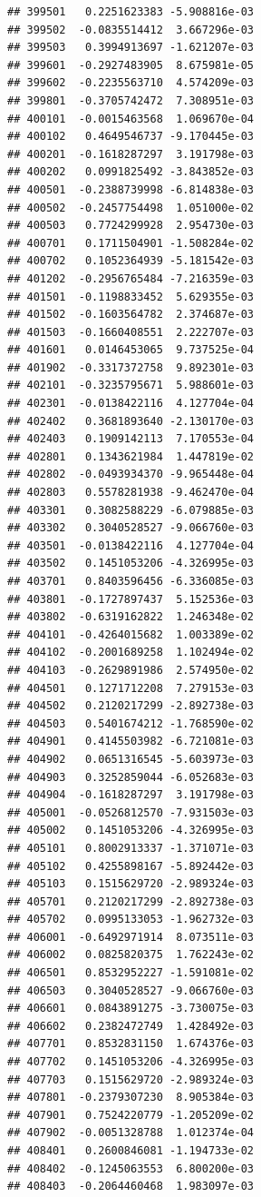 \begin{frame}[fragile]
\begin{verbatim}
## 399501   0.2251623383 -5.908816e-03
## 399502  -0.0835514412  3.667296e-03
## 399503   0.3994913697 -1.621207e-03
## 399601  -0.2927483905  8.675981e-05
## 399602  -0.2235563710  4.574209e-03
## 399801  -0.3705742472  7.308951e-03
## 400101  -0.0015463568  1.069670e-04
## 400102   0.4649546737 -9.170445e-03
## 400201  -0.1618287297  3.191798e-03
## 400202   0.0991825492 -3.843852e-03
## 400501  -0.2388739998 -6.814838e-03
## 400502  -0.2457754498  1.051000e-02
## 400503   0.7724299928  2.954730e-03
## 400701   0.1711504901 -1.508284e-02
## 400702   0.1052364939 -5.181542e-03
## 401202  -0.2956765484 -7.216359e-03
## 401501  -0.1198833452  5.629355e-03
## 401502  -0.1603564782  2.374687e-03
## 401503  -0.1660408551  2.222707e-03
## 401601   0.0146453065  9.737525e-04
## 401902  -0.3317372758  9.892301e-03
## 402101  -0.3235795671  5.988601e-03
## 402301  -0.0138422116  4.127704e-04
## 402402   0.3681893640 -2.130170e-03
## 402403   0.1909142113  7.170553e-04
## 402801   0.1343621984  1.447819e-02
## 402802  -0.0493934370 -9.965448e-04
## 402803   0.5578281938 -9.462470e-04
## 403301   0.3082588229 -6.079885e-03
## 403302   0.3040528527 -9.066760e-03
## 403501  -0.0138422116  4.127704e-04
## 403502   0.1451053206 -4.326995e-03
## 403701   0.8403596456 -6.336085e-03
## 403801  -0.1727897437  5.152536e-03
## 403802  -0.6319162822  1.246348e-02
## 404101  -0.4264015682  1.003389e-02
## 404102  -0.2001689258  1.102494e-02
## 404103  -0.2629891986  2.574950e-02
## 404501   0.1271712208  7.279153e-03
## 404502   0.2120217299 -2.892738e-03
## 404503   0.5401674212 -1.768590e-02
## 404901   0.4145503982 -6.721081e-03
## 404902   0.0651316545 -5.603973e-03
## 404903   0.3252859044 -6.052683e-03
## 404904  -0.1618287297  3.191798e-03
## 405001  -0.0526812570 -7.931503e-03
## 405002   0.1451053206 -4.326995e-03
## 405101   0.8002913337 -1.371071e-03
## 405102   0.4255898167 -5.892442e-03
## 405103   0.1515629720 -2.989324e-03
## 405701   0.2120217299 -2.892738e-03
## 405702   0.0995133053 -1.962732e-03
## 406001  -0.6492971914  8.073511e-03
## 406002   0.0825820375  1.762243e-02
## 406501   0.8532952227 -1.591081e-02
## 406503   0.3040528527 -9.066760e-03
## 406601   0.0843891275 -3.730075e-03
## 406602   0.2382472749  1.428492e-03
## 407701   0.8532831150  1.674376e-03
## 407702   0.1451053206 -4.326995e-03
## 407703   0.1515629720 -2.989324e-03
## 407801  -0.2379307230  8.905384e-03
## 407901   0.7524220779 -1.205209e-02
## 407902  -0.0051328788  1.012374e-04
## 408401   0.2600846081 -1.194733e-02
## 408402  -0.1245063553  6.800200e-03
## 408403  -0.2064460468  1.983097e-03

\end{verbatim}
\end{frame}
